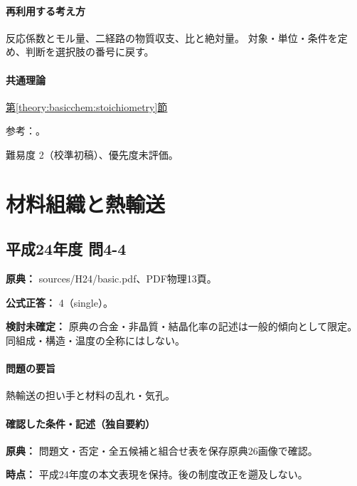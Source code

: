 \paragraph{再利用する考え方} 反応係数とモル量、二経路の物質収支、比と絶対量。 対象・単位・条件を定め、判断を選択肢の番号に戻す。

\paragraph{共通理論} \hyperref[theory:basicchem:stoichiometry]{第\ref*{theory:basicchem:stoichiometry}節}

\par 参考：\cite{chem55_stoich}。

\par 難易度 2（校準初稿）、優先度未評価。

\section{材料組織と熱輸送}

\subsection{平成24年度 問4-4}
\label{q:h24-reg-basic-4-4}

\noindent\textbf{原典：} sources/H24/basic.pdf、PDF物理13頁。

\textbf{公式正答：} 4（single）。

\par\textbf{検討未確定：} 原典の合金・非晶質・結晶化率の記述は一般的傾向として限定。同組成・構造・温度の全称にはしない。

\paragraph{問題の要旨} 熱輸送の担い手と材料の乱れ・気孔。

\paragraph{確認した条件・記述（独自要約）}\mbox{}\par

\noindent\textbf{原典：} 問題文・否定・全五候補と組合せ表を保存原典26画像で確認。\par

\noindent\textbf{時点：} 平成24年度の本文表現を保持。後の制度改正を遡及しない。\par

